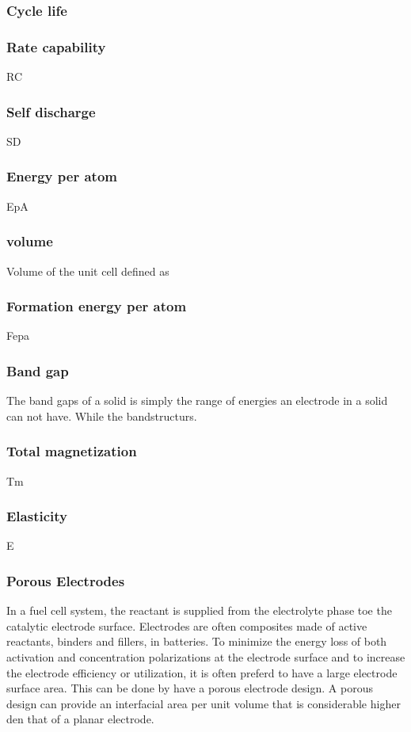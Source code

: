	\subsubsection*{Cycle life}
	
	

	\subsubsection*{Rate capability}
	RC
	\subsubsection*{Self discharge}
	SD
	\subsubsection*{Energy per atom}
	EpA
	\subsubsection*{volume}
	Volume of the unit cell defined as 
	
	\subsubsection*{Formation energy per atom}
	Fepa
	\subsubsection*{Band gap}
	The band gaps of a solid is simply the range of energies an electrode in a solid can not have. While the bandstructurs.
	
	\subsubsection*{Total magnetization}
	Tm
	\subsubsection*{Elasticity}
	E
	\subsubsection*{Porous Electrodes}
	In a fuel cell system, the reactant is supplied from the electrolyte phase toe the catalytic electrode surface. Electrodes are often composites made of active reactants, binders and fillers, in batteries. To minimize the energy loss of both activation and concentration polarizations at the electrode surface and to increase the electrode efficiency or utilization, it is often preferd to have a large electrode surface area. This can be done by have a porous electrode design. A porous design can provide an interfacial area per unit volume that is considerable higher den that of a planar electrode. 
	
